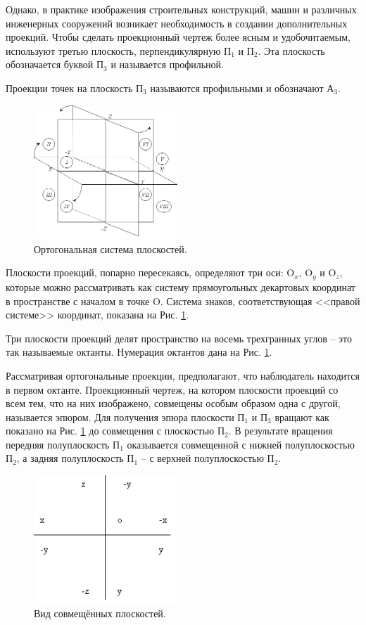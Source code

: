 \documentclass[13pt]{extarticle}
\begin{document}
Однако, в практике изображения строительных конструкций, машин и различных инженерных сооружений возникает необходимость в создании дополнительных проекций. Чтобы сделать проекционный чертеж более ясным и удобочитаемым, используют третью плоскость, перпендикулярную П$_1$ и П$_2$. Эта плоскость обозначается буквой П$_3$  и называется профильной.

Проекции точек на плоскость П$_3$ называются профильными и обозначают А$_3$.

	\begin{figure}
		\includegraphics[width=0.48\textwidth]{Images/ortogonalSystem}
		\caption{Ортогональная система плоскостей.}
		\label{fig:ortSys}
	\end{figure}
	Плоскости проекций, попарно пересекаясь, определяют три оси: O$_x$, O$_y$ и O$_z$, которые можно рассматривать как систему прямоугольных декартовых координат в пространстве с началом в точке O. Система знаков, соответствующая <<правой системе>> координат, показана на Рис. \ref{fig:ortSys}.

Три плоскости проекций делят пространство на восемь трехгранных углов -- это так называемые октанты. Нумерация октантов дана на Рис. \ref{fig:ortSys}.

Рассматривая ортогональные проекции, предполагают, что наблюдатель находится в первом октанте. Проекционный чертеж, на котором плоскости проекций со всем тем, что на них изображено, совмещены особым образом одна с другой, называется эпюром. Для получения эпюра плоскости П$_1$ и П$_3$ вращают как показано на Рис. \ref{fig:ortSys} до совмещения с плоскостью П$_2$. В результате вращения передняя полуплоскость П$_1$ оказывается совмещенной с нижней полуплоскостью П$_2$, а задняя полуплоскость П$_1$ -- с верхней полуплоскостью П$_2$.

	\begin{figure} 
		\includegraphics[width=0.48\textwidth]{Images/complexDraw}
		\caption{Вид совмещённых плоскостей.}
		\label{fig:complDr}
	
	\end{figure}
\end{document}
